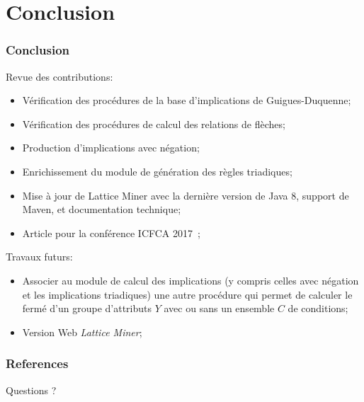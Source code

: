 \documentclass[french]{beamer}
\begin{document}
\section{Conclusion}
\begin{frame}
\frametitle{Conclusion}
Revue des contributions:
\begin{itemize}
\item Vérification des procédures de la base d'implications de Guigues-Duquenne;
\item Vérification des procédures de calcul des relations de flèches;
\item Production d'implications avec négation;
\item Enrichissement du module de génération des règles triadiques;
\item Mise à jour de Lattice Miner avec la dernière version de Java 8, support de Maven, et documentation technique;
\item Article pour la conférence ICFCA 2017~\parencite{Missaoui2017};
\end{itemize}
Travaux futurs:
\begin{itemize}
\item Associer au module de calcul des implications (y compris celles avec négation et les implications triadiques) une autre procédure qui permet de calculer le fermé d'un groupe d'attributs $Y$ avec ou sans un ensemble $C$ de conditions;
\item Version Web \emph{Lattice Miner};
\end{itemize}
\end{frame}
\begin{frame}[allowframebreaks]
\frametitle{References}
\printbibliography
\end{frame}
\begin{frame}
\Huge{\centerline{Questions ?}}
\end{frame}
\end{document}
